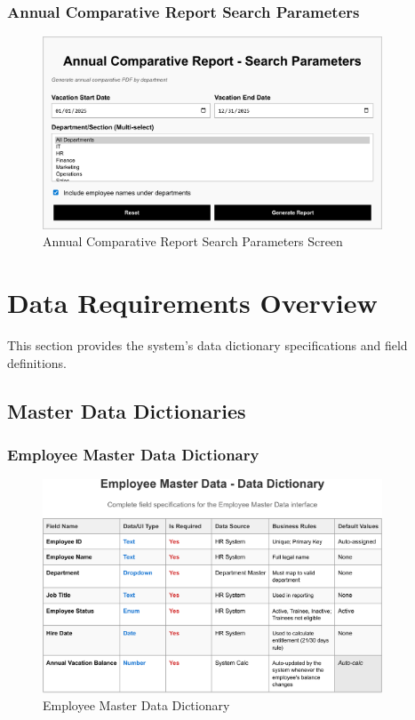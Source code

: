 \documentclass[12pt,a4paper]{article}
\begin{document}
\subsubsection{Annual Comparative Report Search Parameters}
\begin{figure}[H]
\centering
\includegraphics[width=0.9\textwidth]{Wireframes/Annual-Comparative-Report-Search-Parameters/Annual-Comparative-Report-Search-Parameters-1.png}
\caption{Annual Comparative Report Search Parameters Screen}
\label{fig:annual-comparative-report-search-params}
\end{figure}

\section{Data Requirements Overview}

This section provides the system's data dictionary specifications and field definitions.

\subsection{Master Data Dictionaries}

\subsubsection{Employee Master Data Dictionary}
\begin{figure}[H]
\centering
\includegraphics[width=0.9\textwidth]{Data-Dictionary/Master-Data-Dictionaries/Employee-Master-Data-Data-Dictionary/Employee-Master-Data-Data-Dictionary-1.png}
\caption{Employee Master Data Dictionary}
\label{fig:employee-master-data}
\end{figure}
\end{document}

